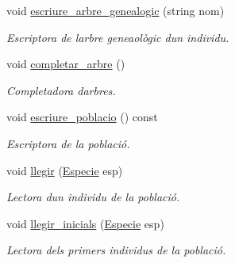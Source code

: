 \begin{DoxyCompactItemize}
void \hyperlink{class_poblacio_a82a6f322f03527ab4273223f351c1036}{escriure\+\_\+arbre\+\_\+genealogic} (string nom)
\begin{DoxyCompactList}\small\item\em Escriptora de l\textquotesingle{}arbre geneaològic d\textquotesingle{}un individu. \end{DoxyCompactList}\item 
void \hyperlink{class_poblacio_abe25acd8c2ce02a747ab79f26cc74f11}{completar\+\_\+arbre} ()
\begin{DoxyCompactList}\small\item\em Completadora d\textquotesingle{}arbres. \end{DoxyCompactList}\item 
void \hyperlink{class_poblacio_acef5af456368a81c4f3be0bd44841bf1}{escriure\+\_\+poblacio} () const 
\begin{DoxyCompactList}\small\item\em Escriptora de la població. \end{DoxyCompactList}\item 
void \hyperlink{class_poblacio_a29df411fde89d37a05fb705e1cc3dd8b}{llegir} (\hyperlink{class_especie}{Especie} esp)
\begin{DoxyCompactList}\small\item\em Lectora d\textquotesingle{}un individu de la població. \end{DoxyCompactList}\item 
void \hyperlink{class_poblacio_a8757ef86688a1e2c25d9264aea934a28}{llegir\+\_\+inicials} (\hyperlink{class_especie}{Especie} esp)
\begin{DoxyCompactList}\small\item\em Lectora dels primers individus de la població. \end{DoxyCompactList}\end{DoxyCompactItemize}
